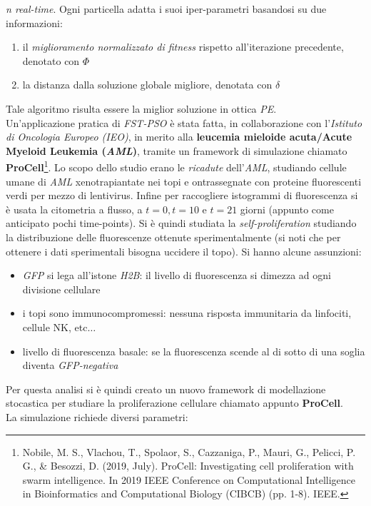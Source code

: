 \documentclass[a4paper,12pt, oneside]{book}
\begin{document}
\textit{n real-time}. Ogni particella adatta i suoi iper-parametri basandosi su
due informazioni:
\begin{enumerate}
  \item il\textit{ miglioramento normalizzato di fitness} rispetto
  all'iterazione precedente, denotato con $\Phi$
  \item la distanza dalla soluzione globale migliore, denotata con $\delta$
\end{enumerate}
Tale algoritmo risulta essere la miglior soluzione in ottica \textit{PE}.\\
Un'applicazione pratica di \textit{FST-PSO} è stata fatta, in collaborazione con
l'\textit{Istituto di Oncologia Europeo (IEO)}, in merito alla \textbf{leucemia
  mieloide acuta/Acute Myeloid Leukemia (\textit{AML})}, tramite un framework di
simulazione chiamato \textbf{ProCell}\footnote{Nobile, M. S.,
  Vlachou, T., Spolaor, S., Cazzaniga, P., Mauri, G., Pelicci, P. G., \&
  Besozzi, 
  D. (2019, July). ProCell: Investigating cell proliferation with swarm
  intelligence. In 2019 IEEE Conference on Computational Intelligence in
  Bioinformatics and Computational Biology (CIBCB) (pp. 1-8). IEEE.}. Lo scopo
dello studio 
erano le \textit{ricadute} dell'\textit{AML}, studiando cellule umane di
\textit{AML} xenotrapiantate nei topi e ontrassegnate con proteine fluorescenti
verdi per mezzo di lentivirus. Infine per raccogliere istogrammi di fluorescenza
si è usata la citometria a flusso, a $t=0, t=10$ e $t=21$ giorni (appunto come
anticipato pochi time-points). Si è quindi studiata la
\textit{self-proliferation} studiando la distribuzione delle fluorescenze
ottenute sperimentalmente (si noti che per ottenere i dati sperimentali bisogna
uccidere il topo). Si hanno alcune assunzioni:
\begin{itemize}
  \item \textit{GFP} si lega all'istone \textit{H2B}: il livello di fluorescenza
  si dimezza ad 
  ogni divisione cellulare 
  \item i topi sono immunocompromessi: nessuna risposta immunitaria da
  linfociti, cellule NK, etc$\ldots$
  \item livello di fluorescenza basale: se la fluorescenza scende al di sotto di
  una soglia diventa \textit{GFP-negativa}
\end{itemize}
Per questa analisi si è quindi creato un nuovo framework di modellazione
stocastica  per
studiare la proliferazione cellulare chiamato appunto \textbf{ProCell}.\\
La simulazione richiede diversi parametri:
\end{document}
